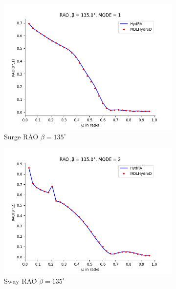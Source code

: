 \begin{figure}[H]
    \centering
    \begin{subfigure}[b]{0.45\textwidth}
        \includegraphics[width=\textwidth]{plots/kcs/rao2/rao1.png}
        \caption{Surge RAO $\beta = 135^{\circ}$}
    \end{subfigure}
    \begin{subfigure}[b]{0.45\textwidth}
        \includegraphics[width=\textwidth]{plots/kcs/rao2/rao2.png}
        \caption{Sway RAO $\beta = 135^{\circ}$}
    \end{subfigure}
    \vspace{5pt}%
    \begin{subfigure}[b]{0.45\textwidth}

\end{subfigure}
\end{figure}
